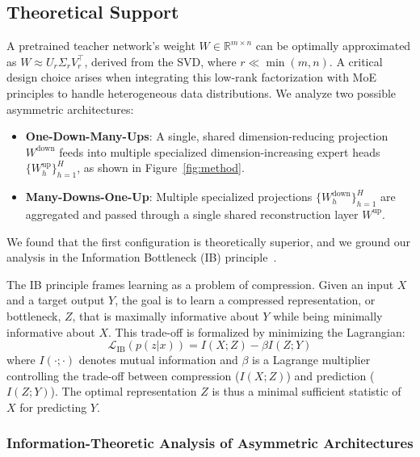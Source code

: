 \documentclass{article} %
\begin{document}
\subsection{Theoretical Support}
\label{sec:support}


A pretrained teacher network's weight $W \in \mathbb{R}^{m \times n}$ can be optimally approximated as $W \approx U_r \Sigma_r V_r^\top$, derived from the SVD, where $r \ll \min(m,n)$. A critical design choice arises when integrating this low-rank factorization with MoE principles to handle heterogeneous data distributions. We analyze two possible asymmetric architectures:
\begin{itemize}[leftmargin=*, topsep=2pt, itemsep=2pt]
    \item \textbf{One-Down-Many-Ups}: A single, shared dimension-reducing projection $W^{\text{down}}$ feeds into multiple specialized dimension-increasing expert heads $\{W^{\text{up}}_h\}_{h=1}^H$, as shown in Figure~\ref{fig:method}.
    \item \textbf{Many-Downs-One-Up}: Multiple specialized projections $\{W^{\text{down}}_h\}_{h=1}^H$ are aggregated and passed through a single shared reconstruction layer $W^{\text{up}}$.
\end{itemize}
We found that the first configuration is theoretically superior, and we ground our analysis in the Information Bottleneck (IB) principle~\citep{koch1987shifts,alemi2016deep,litheory}.

The IB principle frames learning as a problem of compression. Given an input $X$ and a target output $Y$, the goal is to learn a compressed representation, or bottleneck, $Z$, that is maximally informative about $Y$ while being minimally informative about $X$. This trade-off is formalized by minimizing the Lagrangian:
\begin{equation}
    \mathcal{L}_{\text{IB}}(p(z|x)) = I(X; Z) - \beta I(Z; Y)
    \label{eq:ib_lagrangian}
\end{equation}
where $I(\cdot; \cdot)$ denotes mutual information and $\beta$ is a Lagrange multiplier controlling the trade-off between compression ($I(X;Z)$) and prediction ($I(Z;Y)$). The optimal representation $Z$ is thus a minimal sufficient statistic of $X$ for predicting $Y$.

\subsubsection{Information-Theoretic Analysis of Asymmetric Architectures}
\end{document}
